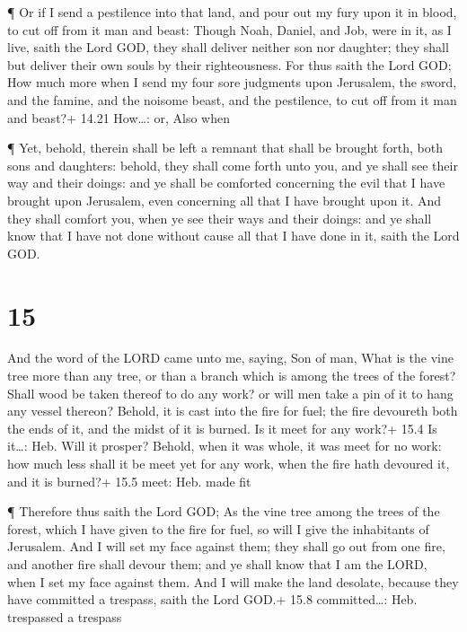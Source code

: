  ¶ Or if I send a pestilence into that land, and pour out
my fury upon it in blood, to cut off from it man and beast:
 Though Noah, Daniel, and Job, were in it, as I live, saith
the Lord GOD, they shall deliver neither son nor daughter; they shall
but deliver their own souls by their righteousness.  For
thus saith the Lord GOD; How much more when I send my four sore
judgments upon Jerusalem, the sword, and the famine, and the noisome
beast, and the pestilence, to cut off from it man and beast?+ 14.21
How\ldots: or, Also when

 ¶ Yet, behold, therein shall be left a remnant that shall
be brought forth, both sons and daughters: behold, they shall come forth
unto you, and ye shall see their way and their doings: and ye shall be
comforted concerning the evil that I have brought upon Jerusalem, even
concerning all that I have brought upon it.  And they shall
comfort you, when ye see their ways and their doings: and ye shall know
that I have not done without cause all that I have done in it, saith the
Lord GOD.

\hypertarget{section-14}{%
\section{15}\label{section-14}}

 And the word of the LORD came unto me, saying, 
Son of man, What is the vine tree more than any tree, or than a branch
which is among the trees of the forest?  Shall wood be taken
thereof to do any work? or will men take a pin of it to hang any vessel
thereon?  Behold, it is cast into the fire for fuel; the
fire devoureth both the ends of it, and the midst of it is burned. Is it
meet for any work?+ 15.4 Is it\ldots: Heb. Will it prosper? 
Behold, when it was whole, it was meet for no work: how much less shall
it be meet yet for any work, when the fire hath devoured it, and it is
burned?+ 15.5 meet: Heb. made fit

 ¶ Therefore thus saith the Lord GOD; As the vine tree among
the trees of the forest, which I have given to the fire for fuel, so
will I give the inhabitants of Jerusalem.  And I will set my
face against them; they shall go out from one fire, and another fire
shall devour them; and ye shall know that I am the LORD, when I set my
face against them.  And I will make the land desolate,
because they have committed a trespass, saith the Lord GOD.+ 15.8
committed\ldots: Heb. trespassed a trespass

